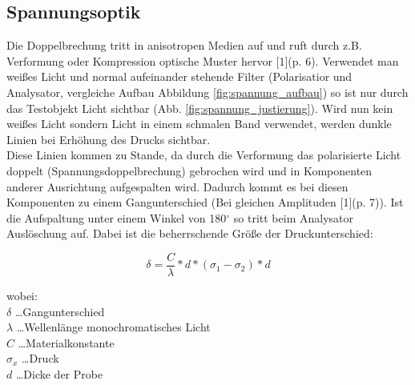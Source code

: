 \documentclass[12pt,a4paper]{article}
\begin{document}
\begin{multicols}{2}
\subsection{Spannungsoptik}
Die Doppelbrechung tritt in anisotropen Medien auf und ruft durch z.B. Verformung oder Kompression optische Muster hervor [1](p. 6). Verwendet man weißes Licht und normal aufeinander stehende Filter (Polarisatior und Analysator, vergleiche Aufbau Abbildung \ref{fig:spannung_aufbau}) so ist nur durch das Testobjekt Licht sichtbar (Abb. \ref{fig:spannung_justierung}). Wird nun kein weißes Licht sondern Licht in einem schmalen Band verwendet, werden dunkle Linien bei Erhöhung des Drucks sichtbar.\\
Diese Linien kommen zu Stande, da durch die Verformung das polarisierte Licht doppelt (Spannungsdoppelbrechung) gebrochen wird und in Komponenten anderer Ausrichtung aufgespalten wird. Dadurch kommt es bei diesen Komponenten zu einem Gangunterschied (Bei gleichen Amplituden [1](p. 7)). Ist die Aufspaltung unter einem Winkel von 180$^\circ$ so tritt beim Analysator Auslöschung auf. Dabei ist die beherrschende Größe der Druckunterschied:

$$\delta = \frac{C}{\lambda}*d*(\sigma_1 - \sigma_2) * d$$

\noindent
wobei:\\
$\delta$ \ldots Gangunterschied\\
$\lambda$ \ldots Wellenlänge monochromatisches Licht\\
$C$ \ldots Materialkonstante\\
$\sigma_x$ \ldots Druck\\
$d$ \ldots Dicke der Probe\\


\end{multicols}
\end{document}
